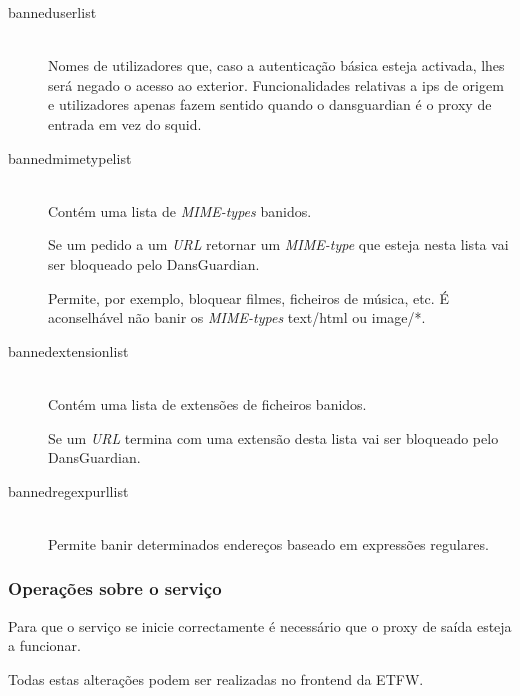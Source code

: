 \begin{description}
\item[banneduserlist]~\\
Nomes de utilizadores que, caso a autenticação básica esteja activada,
lhes será negado o acesso ao exterior.
Funcionalidades relativas a ips de origem e utilizadores apenas fazem
sentido quando o dansguardian é o proxy de entrada em vez do squid.

\item[bannedmimetypelist]~\\
Contém uma lista de \emph{MIME-types} banidos.

Se um pedido a um \emph{URL} retornar um \emph{MIME-type} que esteja
nesta lista vai ser bloqueado pelo DansGuardian.

Permite, por exemplo, bloquear filmes, ficheiros de música, etc.
É aconselhável não banir os \emph{MIME-types} text/html ou image/*.

\item[bannedextensionlist]~\\
Contém uma lista de extensões de ficheiros banidos.

Se um \emph{URL} termina com uma extensão desta lista vai ser
bloqueado pelo DansGuardian.

\item[bannedregexpurllist]~\\
Permite banir determinados endereços baseado em expressões regulares.
\end{description}

\subsubsection{Operações sobre o serviço}


Para que o serviço se inicie correctamente é necessário que o proxy
de saída esteja a funcionar.

Todas estas alterações podem ser realizadas no frontend da \textsf{ETFW}.
